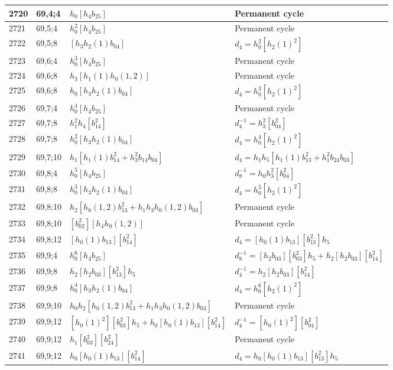 \documentclass{article}
\begin{document}
\begin{longtable}{|l|l|>{\raggedright\arraybackslash}p{6cm}|>{\raggedright\arraybackslash}p{6cm}|}
\hline
2720 & 69,4;4 & $h_0[h_4b_{25}]$ & Permanent cycle\\
\hline
2721 & 69,5;4 & $h_0^2[h_4b_{25}]$ & Permanent cycle\\
\hline
2722 & 69,5;8 & $[h_3h_2(1)b_{04}]$ &$d_{4}=h_0^2[h_2(1)^2]$\\
\hline
2723 & 69,6;4 & $h_0^3[h_4b_{25}]$ & Permanent cycle\\
\hline
2724 & 69,6;8 & $h_3[h_1(1)h_0(1, 2)]$ & Permanent cycle\\
2725 & 69,6;8 & $h_0[h_3h_2(1)b_{04}]$ &$d_{4}=h_0^3[h_2(1)^2]$\\
\hline
2726 & 69,7;4 & $h_0^4[h_4b_{25}]$ & Permanent cycle\\
\hline
2727 & 69,7;8 & $h_1^2h_4[b_{14}^2]$ & $d_{4}^{-1}=h_3^2[b_{04}^2]$\\
2728 & 69,7;8 & $h_0^2[h_3h_2(1)b_{04}]$ &$d_{4}=h_0^4[h_2(1)^2]$\\
\hline
2729 & 69,7;10 & $h_1[h_1(1)b_{14}^2 + h_3^2b_{14}b_{04}]$ &$d_{4}=h_1h_5[h_1(1)b_{13}^2 + h_1^2b_{24}b_{03}]$\\
\hline
2730 & 69,8;4 & $h_0^5[h_4b_{25}]$ & $d_{8}^{-1}=h_0h_3^2[b_{04}^2]$\\
\hline
2731 & 69,8;8 & $h_0^3[h_3h_2(1)b_{04}]$ &$d_{4}=h_0^5[h_2(1)^2]$\\
\hline
2732 & 69,8;10 & $h_2[h_0(1, 2)b_{13}^2 + h_1h_3h_0(1, 2)b_{03}]$ & Permanent cycle\\
2733 & 69,8;10 & $[b_{02}^2][h_4h_0(1, 2)]$ & Permanent cycle\\
\hline
2734 & 69,8;12 & $[h_0(1)b_{13}][b_{14}^2]$ &$d_{4}=[h_0(1)b_{13}][b_{13}^2]h_5$\\
\hline
2735 & 69,9;4 & $h_0^6[h_4b_{25}]$ & $d_{8}^{-1}=[h_2b_{03}][b_{03}^2]h_5 + h_2[h_2b_{03}][b_{14}^2]$\\
\hline
2736 & 69,9;8 & $h_2[h_2b_{03}][b_{13}^2]h_5$ & $d_{4}^{-1}=h_2[h_2b_{03}][b_{14}^2]$\\
2737 & 69,9;8 & $h_0^4[h_3h_2(1)b_{04}]$ &$d_{4}=h_0^6[h_2(1)^2]$\\
\hline
2738 & 69,9;10 & $h_0h_2[h_0(1, 2)b_{13}^2 + h_1h_3h_0(1, 2)b_{03}]$ & Permanent cycle\\
\hline
2739 & 69,9;12 & $[h_0(1)^2][b_{03}^2]h_5 + h_0[h_0(1)b_{13}][b_{14}^2]$ & $d_{4}^{-1}=[h_0(1)^2][b_{04}^2]$\\
2740 & 69,9;12 & $h_1[b_{03}^2][b_{24}^2]$ & Permanent cycle\\
2741 & 69,9;12 & $h_0[h_0(1)b_{13}][b_{14}^2]$ &$d_{4}=h_0[h_0(1)b_{13}][b_{13}^2]h_5$\\

\end{longtable}
\end{document}

